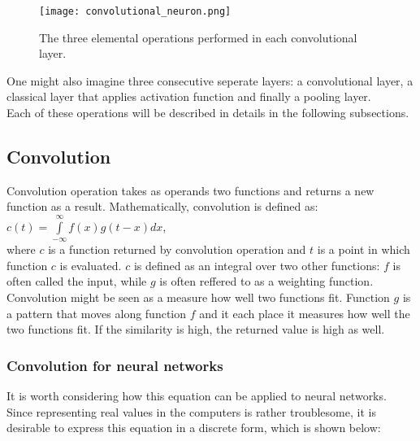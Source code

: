 \documentclass[a4paper,10pt]{report}
\begin{document}
	\begin{figure}[h!]
	  \centering
	  \texttt{[image: convolutional\_neuron.png]}
	  \caption{The three elemental operations performed in each convolutional layer.}
	  \label{fig:con_neur}
	\end{figure} 
	
	  
	One might also imagine three consecutive seperate layers: a convolutional layer, a classical layer that applies activation function and finally a pooling layer.\\
	
	Each of these operations will be described in details in the following subsections.\\
	
	\subsection{Convolution}\label{sec:convolution}
	Convolution operation takes as operands two functions and returns a new function as a result. Mathematically, convolution is defined as: \\
	
	$c(t) = \int\limits_{-\infty}^\infty f(x)g(t-x)dx$,\\
	
	where $c$ is a function returned by convolution operation and $t$ is a point in which function $c$ is evaluated. $c$ is defined as an integral over two other functions: $f$ is often called the input, while $g$ is often reffered to as a weighting function.\\
	
	Convolution might be seen as a measure how well two functions fit. Function $g$ is a pattern that moves along function $f$ and it each place it measures how well the two functions fit. If the similarity is high, the returned value is high as well. 
		
	\subsubsection{Convolution for neural networks}
	  
	  It is worth considering how this equation can be applied to neural networks. Since representing real values in the computers is rather troublesome, it is desirable to express this equation in a discrete form, which is shown below:\\
	  
\end{document}
